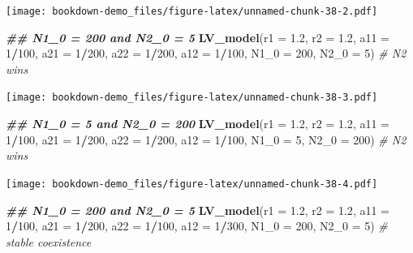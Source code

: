 \documentclass[
]{book}
\newenvironment{Shaded}{\begin{snugshade}}{\end{snugshade}}
\newcommand{\AttributeTok}[1]{\textcolor[rgb]{0.13,0.29,0.53}{#1}}
\newcommand{\CommentTok}[1]{\textcolor[rgb]{0.56,0.35,0.01}{\textit{#1}}}
\newcommand{\DecValTok}[1]{\textcolor[rgb]{0.00,0.00,0.81}{#1}}
\newcommand{\DocumentationTok}[1]{\textcolor[rgb]{0.56,0.35,0.01}{\textbf{\textit{#1}}}}
\newcommand{\FloatTok}[1]{\textcolor[rgb]{0.00,0.00,0.81}{#1}}
\newcommand{\FunctionTok}[1]{\textcolor[rgb]{0.13,0.29,0.53}{\textbf{#1}}}
\newcommand{\NormalTok}[1]{#1}
\newcommand{\SpecialCharTok}[1]{\textcolor[rgb]{0.81,0.36,0.00}{\textbf{#1}}}
\begin{document}
\texttt{[image: bookdown-demo\_files/figure-latex/unnamed-chunk-38-2.pdf]}

\begin{Shaded}
\begin{Highlighting}[]
  \DocumentationTok{\#\# N1\_0 = 200 and N2\_0 = 5}
  \FunctionTok{LV\_model}\NormalTok{(}\AttributeTok{r1 =} \FloatTok{1.2}\NormalTok{, }\AttributeTok{r2 =} \FloatTok{1.2}\NormalTok{, }
           \AttributeTok{a11 =} \DecValTok{1}\SpecialCharTok{/}\DecValTok{100}\NormalTok{, }\AttributeTok{a21 =} \DecValTok{1}\SpecialCharTok{/}\DecValTok{200}\NormalTok{, }\AttributeTok{a22 =} \DecValTok{1}\SpecialCharTok{/}\DecValTok{200}\NormalTok{, }\AttributeTok{a12 =} \DecValTok{1}\SpecialCharTok{/}\DecValTok{100}\NormalTok{, }
           \AttributeTok{N1\_0 =} \DecValTok{200}\NormalTok{, }\AttributeTok{N2\_0 =} \DecValTok{5}\NormalTok{)  }\CommentTok{\# N2 wins}
\end{Highlighting}
\end{Shaded}

\texttt{[image: bookdown-demo\_files/figure-latex/unnamed-chunk-38-3.pdf]}

\begin{Shaded}
\begin{Highlighting}[]
  \DocumentationTok{\#\# N1\_0 = 5 and N2\_0 = 200}
  \FunctionTok{LV\_model}\NormalTok{(}\AttributeTok{r1 =} \FloatTok{1.2}\NormalTok{, }\AttributeTok{r2 =} \FloatTok{1.2}\NormalTok{, }
           \AttributeTok{a11 =} \DecValTok{1}\SpecialCharTok{/}\DecValTok{100}\NormalTok{, }\AttributeTok{a21 =} \DecValTok{1}\SpecialCharTok{/}\DecValTok{200}\NormalTok{, }\AttributeTok{a22 =} \DecValTok{1}\SpecialCharTok{/}\DecValTok{200}\NormalTok{, }\AttributeTok{a12 =} \DecValTok{1}\SpecialCharTok{/}\DecValTok{100}\NormalTok{, }
           \AttributeTok{N1\_0 =} \DecValTok{5}\NormalTok{, }\AttributeTok{N2\_0 =} \DecValTok{200}\NormalTok{)  }\CommentTok{\# N2 wins}
\end{Highlighting}
\end{Shaded}

\texttt{[image: bookdown-demo\_files/figure-latex/unnamed-chunk-38-4.pdf]}

\begin{Shaded}
\begin{Highlighting}[]
  \DocumentationTok{\#\# N1\_0 = 200 and N2\_0 = 5}
  \FunctionTok{LV\_model}\NormalTok{(}\AttributeTok{r1 =} \FloatTok{1.2}\NormalTok{, }\AttributeTok{r2 =} \FloatTok{1.2}\NormalTok{, }
           \AttributeTok{a11 =} \DecValTok{1}\SpecialCharTok{/}\DecValTok{100}\NormalTok{, }\AttributeTok{a21 =} \DecValTok{1}\SpecialCharTok{/}\DecValTok{200}\NormalTok{, }\AttributeTok{a22 =} \DecValTok{1}\SpecialCharTok{/}\DecValTok{100}\NormalTok{, }\AttributeTok{a12 =} \DecValTok{1}\SpecialCharTok{/}\DecValTok{300}\NormalTok{, }
           \AttributeTok{N1\_0 =} \DecValTok{200}\NormalTok{, }\AttributeTok{N2\_0 =} \DecValTok{5}\NormalTok{)  }\CommentTok{\# stable coexistence}
\end{Highlighting}
\end{Shaded}
\end{document}
